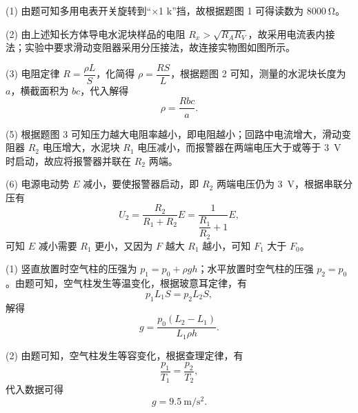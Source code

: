 \begin{answer}
(1) 由题可知多用电表开关旋转到“$\times$1 k”挡，故根据题图 1 可得读数为 $\SI{8000}{\ohm}$。

(2) 由上述知长方体导电水泥块样品的电阻 $R_{x}>\sqrt{R_{A}R_{V}}$，故采用电流表内接法；实验中要求滑动变阻器采用分压接法，故连接实物图如图所示。


(3) 电阻定律 $R=\dfrac{\rho L}{S}$，化简得 $\rho=\dfrac{RS}{L}$，根据题图 2 可知，测量的水泥块长度为 $a$，横截面积为 $bc$，代入解得
\[
  \rho=\frac{Rbc}{a}.
\]

(5) 根据题图 3 可知压力越大电阻率越小，即电阻越小；回路中电流增大，滑动变阻器 $R_{2}$ 电压增大，水泥块 $R_{1}$ 电压减小，而报警器在两端电压大于或等于 \SI{3}{\volt} 时启动，故应将报警器并联在 $R_{2}$ 两端。

(6) 电源电动势 $E$ 减小，要使报警器启动，即 $R_{2}$ 两端电压仍为 \SI{3}{\volt}，根据串联分压有
\[
  U_{2}=\frac{R_{2}}{R_{1}+R_{2}}E=\frac{1}{\dfrac{R_{1}}{R_{2}}+1}E,
\]
可知 $E$ 减小需要 $R_{1}$ 更小，又因为 $F$ 越大 $R_{1}$ 越小，可知 $F_{1}$ 大于 $F_{0}$。
\end{answer}

\begin{answer}
(1) 竖直放置时空气柱的压强为 $p_{1}=p_{0}+\rho gh$；水平放置时空气柱的压强 $p_{2}=p_{0}$。由题可知，空气柱发生等温变化，根据玻意耳定律，有
\[
  p_{1}L_{1}S=p_{2}L_{2}S,
\]
解得
\[
  g=\frac{p_{0}(L_{2}-L_{1})}{L_{1}\rho h}.
\]

(2) 由题可知，空气柱发生等容变化，根据查理定律，有
\[
  \frac{p_{1}}{T_{1}}=\frac{p_{2}}{T_{2}},
\]
代入数据可得
\[
  g=\SI{9.5}{\metre\per\second\squared}.
\]
\end{answer}

